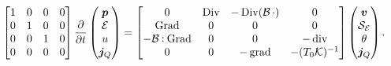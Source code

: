 \documentclass[11t]{article}
\DeclareMathOperator*{\grad}{grad}
\DeclareMathOperator*{\Grad}{Grad}
\DeclareMathOperator*{\Div}{Div}
\renewcommand{\div}{\operatorname{div}}
\def\onedot{$\mathsurround0pt\ldotp$}
\def\cddot{%
	\mathbin{\vcenter{\baselineskip.67ex
			\hbox{\onedot}\hbox{\onedot}}%
}}
\begin{document}
\begin{equation}
\begin{bmatrix}
1 & 0 & 0 & 0\\
0 & 1 & 0 & 0\\
0 & 0 & 1 & 0\\
0 & 0 & 0 & 0\\
\end{bmatrix}
\diffp{}{t}
\begin{pmatrix}
\bm{p} \\
\mathcal{E} \\
u \\
\bm{j}_Q \\
\end{pmatrix} = 
\begin{bmatrix}
0 & \Div & - \Div(\mathcal{B} \, \cdot) & 0\\
\Grad & 0 & 0 & 0 \\
- \mathcal{B} \cddot  \Grad & 0 & 0 & -\div \\
0 & 0 & -\grad & - (T_0 \mathcal{K})^{-1} \\
\end{bmatrix}
\begin{pmatrix}
\bm{v} \\
\mathcal{S_E} \\
\theta \\
\bm{j}_Q \\
\end{pmatrix}.
\end{equation}
\end{document}
